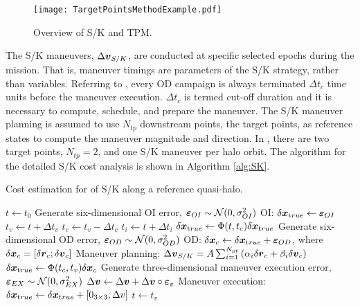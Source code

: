 %
\begin{figure}[]
	\centering
	\texttt{[image: TargetPointsMethodExample.pdf]}
	\caption{Overview of S/K and TPM.}
	\label{fig:TargetPointsMethodExample}
\end{figure}
%
The S/K maneuvers, $\Delta\boldsymbol{v}_{S/K}$, are conducted at specific selected epochs during the mission. That is, maneuver timings are parameters of the S/K strategy, rather than variables. Referring to , every {OD} campaign is always terminated $\Delta t_c$ time units before the maneuver execution. $\Delta t_c$ is termed cut-off duration and it is necessary to compute, schedule, and prepare the  maneuver. The S/K maneuver planning is assumed to use $N_{tp}$ downstream points, \ie the target points, as reference states to compute the maneuver magnitude and direction. In , there are two target points, $N_{tp} = 2$, and one S/K maneuver per halo orbit. The algorithm for the detailed S/K cost analysis is shown in Algorithm \ref{alg:SK}.

%
\begin{algorithm}[]
	\caption{Cost estimation for of S/K along a reference quasi-halo.}\label{alg:SK}
	\begin{algorithmic}[1]
		\State $t\gets t_0$
		\State Generate six-dimensional OI error, $\boldsymbol{\varepsilon}_{OI}\sim\mathcal{N}(0,\sigma_{OI}^2)$
		\State OI: $\delta \boldsymbol{x}_{\textrm true}\gets\boldsymbol{\varepsilon}_{OI}$
		\State $t_v\gets t+\Delta t_v$
		\State $t_c\gets t_v-\Delta t_c$
		\State $t_i\gets t+\Delta t_i$
		\State $\delta \boldsymbol{x}_{\textrm true}\gets \Phi(t,t_c)\delta \boldsymbol{x}_{\textrm true}$
		\State Generate six-dimensional OD error, $\boldsymbol{\varepsilon}_{OD}\sim\mathcal{N}(0,\sigma_{OD}^2)$
		\State OD: $\delta \boldsymbol{x}_{c}\gets\delta \boldsymbol{x}_{\textrm true}+\boldsymbol{\varepsilon}_{OD}$, where $\delta \boldsymbol{x}_{c} = [\delta \boldsymbol{r}_{c};\delta \boldsymbol{v}_{c}]$
		\State Maneuver planning: $\Delta\boldsymbol{v}_{S/K} = A\sum_{i=1}^{N_{pt}}\left(\alpha_i\delta\boldsymbol{r}_c+\beta_i\delta\boldsymbol{v}_c\right)$ 
		\State $\delta \boldsymbol{x}_{\textrm true}\gets \Phi(t_c,t_v)\delta \boldsymbol{x}_{c}$
		\State Generate three-dimensional maneuver execution error, $\boldsymbol{\varepsilon}_{EX}\sim\mathcal{N}(0,\sigma_{EX}^2)$
		\State $\Delta\boldsymbol{v}\gets\Delta\boldsymbol{v}+\Delta\boldsymbol{v}\circ\boldsymbol{\varepsilon}_v$ 
		\State Maneuver execution: $\delta \boldsymbol{x}_{\textrm true}\gets\delta \boldsymbol{x}_{\textrm true}+[0_{3\times3};\Delta v]$
		\State $t\gets t_v$
		\EndWhile
		\EndFunction
	\end{algorithmic}
\end{algorithm}
% 

